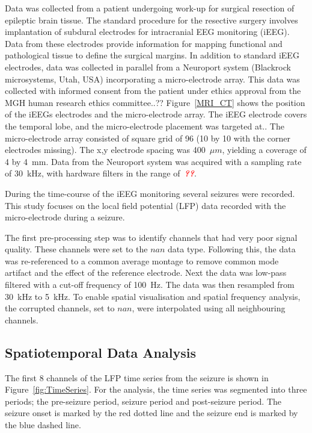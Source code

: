 \documentclass[]{article}
\newcommand{\dean}[1]{\textsf{\emph{\textbf{\textcolor{red}{#1}}}}}
\begin{document}
Data was collected from a patient undergoing work-up for surgical resection of epileptic brain tissue. The standard procedure for the resective surgery involves implantation of subdural electrodes for intracranial EEG monitoring (iEEG). Data from these electrodes provide information for mapping functional and pathological tissue to define the surgical margins. In addition to standard iEEG electrodes, data was collected in parallel from a Neuroport system (Blackrock microsystems, Utah, USA) incorporating a micro-electrode array. This data was collected with informed consent from the patient under ethics approval from the MGH human research ethics committee..?? Figure~\ref{MRI_CT} shows the position of the iEEGs electrodes and the micro-electrode array. The iEEG electrode covers the temporal lobe, and the micro-electrode placement was targeted at.. The micro-electrode array consisted of square grid of 96 (10 by 10 with the corner electrodes missing). The x,y electrode spacing was 400~$\mu m$, yielding a coverage of 4 by 4~mm. Data from the Neuroport system was acquired with a sampling rate of 30~kHz, with hardware filters in the range of~\dean{??}. 

During the time-course of the iEEG monitoring several seizures were recorded. This study focuses on the local field potential (LFP) data recorded with the micro-electrode during a seizure. 

The first pre-processing step was to identify channels that had very poor signal quality. These channels were set to the $nan$ data type. Following this, the data was re-referenced to a common average montage to remove common mode artifact and the effect of the reference electrode. Next the data was low-pass filtered with a cut-off frequency of 100~Hz. The data was then resampled from 30~kHz to 5~kHz. To enable spatial visualisation and spatial frequency analysis, the corrupted channels, set to $nan$, were interpolated using all neighbouring channels.

\subsection{Spatiotemporal Data Analysis}
The first 8 channels of the LFP time series from the seizure is shown in Figure~\ref{fig:TimeSeries}. For the analysis, the time series was segmented into three periods; the pre-seizure period, seizure period and post-seizure period. The seizure onset is marked by the red dotted line and the seizure end is marked by the blue dashed line. 
\end{document}
